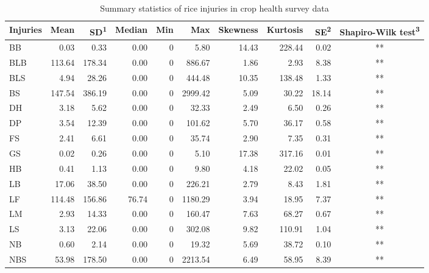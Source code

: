 \begin{landscape}
\begin{table}\small
\centering
\caption{Summary statistics of rice injuries in crop health survey data}
\label{table:summary_injuries}
\begin{threeparttable}
\begin{tabular}{lrrrrrrrrc}
\hline
Injuries & Mean   & SD\textsuperscript{1}     & Median & Min  & Max     & Skewness & Kurtosis & SE\textsuperscript{2}    & Shapiro-Wilk test\textsuperscript{3} \\
\hline
BB   & 0.03   & 0.33   & 0.00   & 0 & 5.80    & 14.43    & 228.44   & 0.02  & **               \\
BLB  & 113.64 & 178.34 & 0.00   & 0 & 886.67  & 1.86     & 2.93     & 8.38  & **               \\
BLS  & 4.94   & 28.26  & 0.00   & 0 & 444.48  & 10.35    & 138.48   & 1.33  & **               \\
BS   & 147.54 & 386.19 & 0.00   & 0 & 2999.42 & 5.09     & 30.22    & 18.14 & **               \\
DH   & 3.18   & 5.62   & 0.00   & 0 & 32.33   & 2.49     & 6.50     & 0.26  & **               \\
DP   & 3.54   & 12.39  & 0.00   & 0 & 101.62  & 5.70     & 36.17    & 0.58  & **               \\
FS   & 2.41   & 6.61   & 0.00   & 0 & 35.74   & 2.90     & 7.35     & 0.31  & **               \\
GS   & 0.02   & 0.26   & 0.00   & 0 & 5.10    & 17.38    & 317.16   & 0.01  & **               \\
HB   & 0.41   & 1.13   & 0.00   & 0 & 9.80    & 4.18     & 22.02    & 0.05  & **               \\
LB   & 17.06  & 38.50  & 0.00   & 0 & 226.21  & 2.79     & 8.43     & 1.81  & **               \\
LF   & 114.48 & 156.86 & 76.74  & 0 & 1180.29 & 3.94     & 18.95    & 7.37  & **               \\
LM   & 2.93   & 14.33  & 0.00   & 0 & 160.47  & 7.63     & 68.27    & 0.67  & **               \\
LS   & 3.13   & 22.06  & 0.00   & 0 & 302.08  & 9.82     & 110.91   & 1.04  & **               \\
NB   & 0.60   & 2.14   & 0.00   & 0 & 19.32   & 5.69     & 38.72    & 0.10  & **               \\
NBS  & 53.98  & 178.50 & 0.00   & 0 & 2213.54 & 6.49     & 58.95    & 8.39  & **               \\

\end{tabular}
\end{threeparttable}
\end{table}
\end{landscape}
